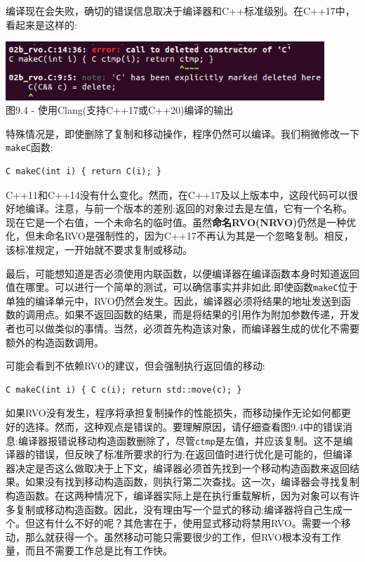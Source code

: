 编译现在会失败，确切的错误信息取决于编译器和C++标准级别。在C++17中，看起来是这样的:

\begin{center}
\includegraphics[width=0.9\textwidth]{content/3/chapter9/images/4.jpg}\\
图9.4 - 使用Clang(支持C++17或C++20)编译的输出
\end{center}

特殊情况是，即使删除了复制和移动操作，程序仍然可以编译。我们稍微修改一下\texttt{makeC}函数:

\begin{lstlisting}[style=styleCXX]
C makeC(int i) { return C(i); }
\end{lstlisting}

C++11和C++14没有什么变化。然而，在C++17及以上版本中，这段代码可以很好地编译。注意，与前一个版本的差别:返回的对象过去是左值，它有一个名称。现在它是一个右值，一个未命名的临时值。虽然\textbf{命名RVO(NRVO)}仍然是一种优化，但未命名RVO是强制性的，因为C++17不再认为其是一个忽略复制。相反，该标准规定，一开始就不要求复制或移动。 

最后，可能想知道是否必须使用内联函数，以便编译器在编译函数本身时知道返回值在哪里。可以进行一个简单的测试，可以确信事实并非如此:即使函数\texttt{makeC}位于单独的编译单元中，RVO仍然会发生。因此，编译器必须将结果的地址发送到函数的调用点。如果不返回函数的结果，而是将结果的引用作为附加参数传递，开发者也可以做类似的事情。当然，必须首先构造该对象，而编译器生成的优化不需要额外的构造函数调用。 

可能会看到不依赖RVO的建议，但会强制执行返回值的移动:

\begin{lstlisting}[style=styleCXX]
C makeC(int i) { C c(i); return std::move(c); }
\end{lstlisting}

如果RVO没有发生，程序将承担复制操作的性能损失，而移动操作无论如何都更好的选择。然而，这种观点是错误的。要理解原因，请仔细查看图9.4中的错误消息:编译器报错说移动构造函数删除了，尽管\texttt{ctmp}是左值，并应该复制。这不是编译器的错误，但反映了标准所要求的行为:在返回值时进行优化是可能的，但编译器决定是否这么做取决于上下文，编译器必须首先找到一个移动构造函数来返回结果。如果没有找到移动构造函数，则执行第二次查找。这一次，编译器会寻找复制构造函数。在这两种情况下，编译器实际上是在执行重载解析，因为对象可以有许多复制或移动构造函数。因此，没有理由写一个显式的移动:编译器将自己生成一个。但这有什么不好的呢？其危害在于，使用显式移动将禁用RVO。需要一个移动，那么就获得一个。虽然移动可能只需要很少的工作，但RVO根本没有工作量，而且不需要工作总是比有工作快。

